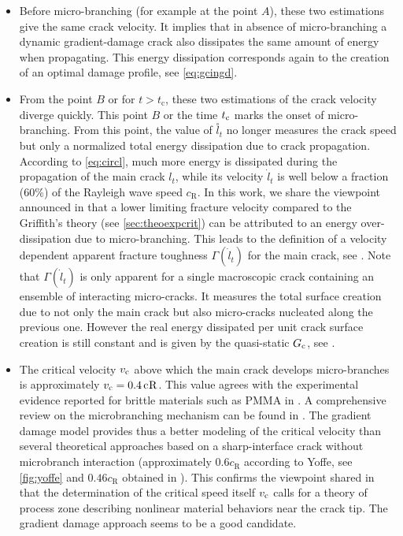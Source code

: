 \begin{itemize}
\item Before micro-branching (for example at the point $A$), these two estimations give the same crack velocity. It implies that in absence of micro-branching a dynamic gradient-damage crack also dissipates the same amount of energy when propagating. This energy dissipation corresponds again to the creation of an optimal damage profile, see \eqref{eq:gcingd}.

\item From the point $B$ or for $t>t_\mathrm{c}$, these two estimations of the crack velocity diverge quickly. This point $B$ or the time $t_{\mathrm{c}}$ marks the onset of micro-branching. From this point, the value of $\overset{\circ}{l}_t$ no longer measures the crack speed but only a normalized total energy dissipation due to crack propagation. According to \eqref{eq:circl}, much more energy is dissipated during the propagation of the main crack $l_t$, while its velocity $\dot{l}_t$ is well below a fraction (60\%) of the Rayleigh wave speed $c_\mathrm{R}$. In this work, we share the viewpoint announced in \cite{SharonFineberg:1996} that a lower limiting fracture velocity compared to the Griffith's theory (see \cref{sec:theoexpcrit}) can be attributed to an energy over-dissipation due to micro-branching. This leads to the definition of a velocity dependent apparent fracture toughness $\Gamma(\dot{l}_t)$ for the main crack, see \cite{SharonFineberg:1996,SharonFineberg:1999}. Note that $\Gamma(\dot{l}_t)$ is only apparent for a single macroscopic crack containing an ensemble of interacting micro-cracks. It measures the total surface creation due to not only the main crack but also micro-cracks nucleated along the previous one. However the real energy dissipated per unit crack surface creation is still constant and is given by the quasi-static $G_\mathrm{c}$, see \cite{SharonFineberg:1996}.

\item The critical velocity $v_{\mathrm{c}}$ above which the main crack develops micro-branches is approximately $v_{\mathrm{c}}=\SI{0.4}{c_\mathrm{R}}$. This value agrees with the experimental evidence reported for brittle materials such as PMMA in \cite{FinebergGrossMarderSwinney:1992a}. A comprehensive review on the microbranching mechanism can be found in \cite{FinebergMarder:1999}. The gradient damage model provides thus a better modeling of the critical velocity than several theoretical approaches based on a sharp-interface crack without microbranch interaction (approximately $0.6c_\mathrm{R}$ according to Yoffe, see \cref{fig:yoffe} and $0.46c_\mathrm{R}$ obtained in \cite{KatzavAdda-BediaArias:2007}). This confirms the viewpoint shared in \cite{Ravi-Chandar:1998} that the determination of the critical speed itself $v_{\mathrm{c}}$ calls for a theory of process zone describing nonlinear material behaviors near the crack tip. The gradient damage approach seems to be a good candidate.
\end{itemize}

